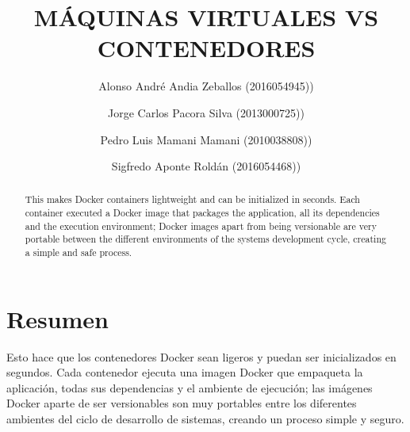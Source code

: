 \documentclass[preprint,12pt]{elsarticle}
\begin{document}
	\begin{frontmatter} 

		\title{\huge MÁQUINAS VIRTUALES VS CONTENEDORES}
		
		\author{Alonso André Andia Zeballos              	(2016054945))}
		\author{Jorge Carlos Pacora Silva              	        (2013000725))}
		\author{Pedro Luis Mamani Mamani	         	(2010038808))}  
		\author{Sigfredo Aponte Roldán             		(2016054468))}  
		\address{Escuela Profesional de Ingeniería de Sistemas}
		\address{Universidad Privada de Tacna}
		\address{Tacna, Perú}
		

		\begin{abstract}	
This makes Docker containers lightweight and can be initialized in seconds. Each container executed a Docker image that packages the application, all its dependencies and the execution environment; Docker images apart from being versionable are very portable between the different environments of the systems development cycle, creating a simple and safe process.

		\end{abstract}


	\end{frontmatter}


\section{Resumen}
Esto hace que los contenedores Docker sean ligeros y puedan ser inicializados en segundos. Cada contenedor ejecuta una imagen Docker que empaqueta la aplicación, todas sus dependencias y el ambiente de ejecución; las imágenes Docker aparte de ser versionables son muy portables entre los diferentes ambientes del ciclo de desarrollo de sistemas, creando un proceso simple y seguro. 



\end{document}
